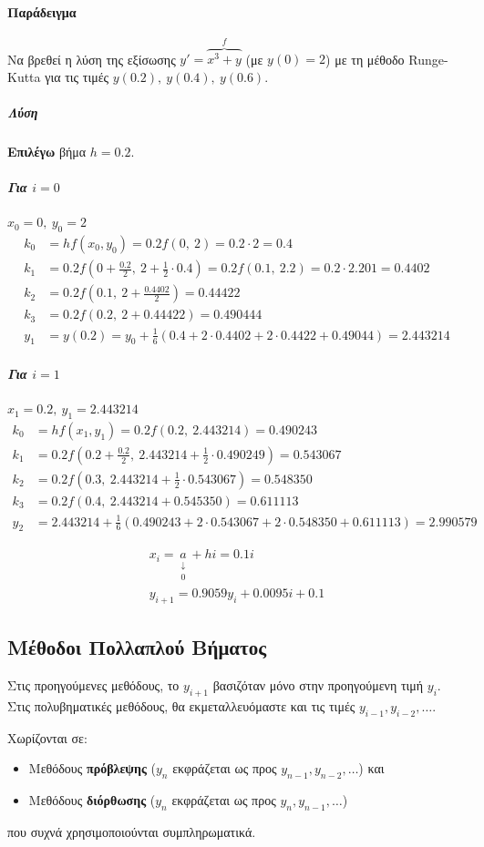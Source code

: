 \documentclass[11pt,a4paper,notitlepage,fleqn,final]{article}
\begin{document}
\paragraph{Παράδειγμα}
Να βρεθεί η λύση της εξίσωσης \( y' = \overbrace{x^3+y}^f \)
(με \( y(0)=2 \))
με τη μέθοδο Runge-Kutta για τις τιμές \( y(0.2),\ y(0.4),\ y(0.6) \).
\subparagraph{Λύση}
\textbf{Επιλέγω} βήμα \( h=0.2 \).
\subparagraph{Για \( i=0 \)} \( x_0=0,\ y_0=2 \)
\begin{align*}
	k_0 &= hf(x_0,y_0) =
	0.2f(0,\ 2)=0.2\cdot 2 = 0.4 \\
	k_1 &= 0.2f\left(
	0+\frac{0.2}{2},\ 2+\frac{1}{2}\cdot 0.4
	\right) = 0.2f(0.1,\ 2.2) = 0.2 \cdot 2.201 = 0.4402 \\
	k_2 &= 0.2f(0.1,\ 2+\frac{0.4402}{2}) = 0.44422 \\
	k_3 &= 0.2f(0.2,\ 2+0.44422) = 0.490444 \\
	y_1 &= y(0.2) = y_0+\frac{1}{6}(
	0.4+2\cdot 0.4402+2\cdot 0.4422 + 0.49044
	) = 2.443214
\end{align*}
\subparagraph{Για \( i=1 \)} \( x_1=0.2,\ y_1=2.443214 \)
\begin{align*}
	k_0 &= hf(x_1,y_1) = 0.2f(0.2,\ 2.443214) =
	0.490243 \\
	k_1 &= 0.2f\left( 0.2+\frac{0.2}{2},\ 2.443214+\frac{1}{2}
	\cdot 0.490249 \right) = 0.543067 \\
	k_2 &= 0.2f(0.3,\ 2.443214+\frac{1}{2}\cdot 0.543067)
	= 0.548350 \\
	k_3 &= 0.2f(0.4,\ 2.443214+0.545350) = 0.611113 \\
	y_2 &= 2.443214+\frac{1}{6}(0.490243+2\cdot 0.543067
	+2\cdot 0.548350+0.611113)
	= 2.990579
\end{align*}

\begin{gather*}
	x_i = \underset{\substack{\downarrow\\ 0}}{a}+hi=0.1i \\
	y_{i+1} = 0.9059y_i + 0.0095i + 0.1
\end{gather*}

\subsection{Μέθοδοι Πολλαπλού Βήματος}
Στις προηγούμενες μεθόδους, το \( y_{i+1} \) βασιζόταν μόνο στην
προηγούμενη τιμή \( y_i \). Στις πολυβηματικές μεθόδους, θα
εκμεταλλευόμαστε και τις τιμές \( y_{i-1},y_{i-2},\dots \).

Χωρίζονται σε:
\begin{itemize}
	\item Μεθόδους \textbf{πρόβλεψης}
	(\( y_n \) εκφράζεται ως προς \( y_{n-1},y_{n-2},\dots \)) και
	\item Μεθόδους \textbf{διόρθωσης}
	(\( y_n \) εκφράζεται ως προς \( y_n,y_{n-1},\dots \))
\end{itemize}
που συχνά χρησιμοποιούνται συμπληρωματικά.
\end{document}
